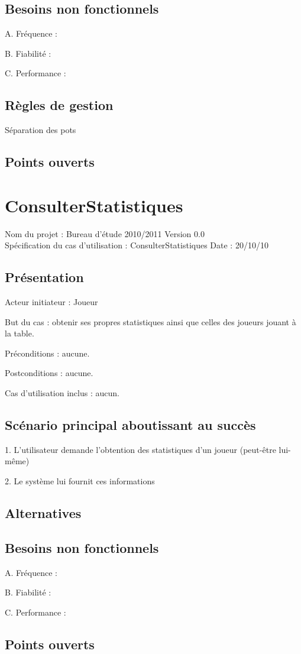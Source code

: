 \documentclass[a4paper]{article}
\newcommand{\cutitle}[4]{
\newpage
\section{#2}
\noindent Nom du projet : #1 \hfill Version #3\\
Spécification du cas d'utilisation : #2 \hfill Date : #4
}
\newcommand{\cutitleshort}[3]{\cutitle{Bureau d'étude 2010/2011}{#1}{#2}{#3}}
\newcommand{\cupresentation}[5]{
\subsection{Présentation}
Acteur initiateur : #1\par
But du cas : #2\par
Préconditions : #3\par
Postconditions : #4\par
Cas d'utilisation inclus : #5
}
\newcommand{\cuscenario}{\subsection{Scénario principal aboutissant au succès}}
\newcommand{\cuscensys}{\hspace{1cm}}
\newcommand{\cualternat}{\subsection{Alternatives}}
\newcommand{\cubesoinsnf}[3]{
\subsection{Besoins non fonctionnels}
A. Fréquence : #1\par
B. Fiabilité : #2\par
C. Performance : #3
}
\newcommand{\cureglesg}{\subsection{Règles de gestion}}
\newcommand{\cutodol}{\subsection{Points ouverts}}
\begin{document}
\cubesoinsnf{}{}{}

\cureglesg 

Séparation des pots

\cutodol

\cutitleshort{ConsulterStatistiques}{0.0}{20/10/10}

\cupresentation{Joueur}
{obtenir ses propres statistiques ainsi que celles des joueurs jouant à la table.}
{aucune.}
{aucune.}
{aucun.}

\cuscenario

1. L'utilisateur demande l'obtention des statistiques d'un joueur (peut-être lui-même)

\cuscensys 2. Le système lui fournit ces informations

\cualternat

\cubesoinsnf{}{}{}

\cutodol
\end{document}
